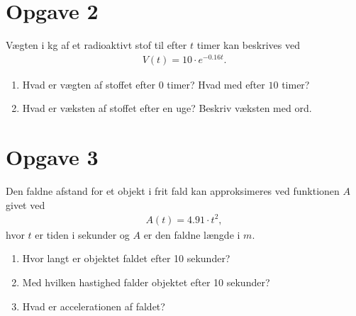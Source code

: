 \section*{Opgave 2}
Vægten i kg af et radioaktivt stof til efter $t$ timer kan beskrives ved
\begin{align*}
V(t) =10\cdot e^{-0.16t}.
\end{align*}
\begin{enumerate}
\item Hvad er vægten af stoffet efter $0$ timer? Hvad med efter $10$ timer?
\item Hvad er væksten af stoffet efter en uge? Beskriv væksten med ord.
\end{enumerate}
\section*{Opgave 3}
Den faldne afstand for et objekt i frit fald kan approksimeres ved funktionen $A$ givet ved
\begin{align*}
A(t) = 4.91 \cdot t^2, 
\end{align*}
hvor $t$ er tiden i sekunder og $A$ er den faldne længde i $m$.
\begin{enumerate}
\item Hvor langt er objektet faldet efter 10 sekunder?
\item Med hvilken hastighed falder objektet efter 10 sekunder?
\item Hvad er accelerationen af faldet?
\end{enumerate}
